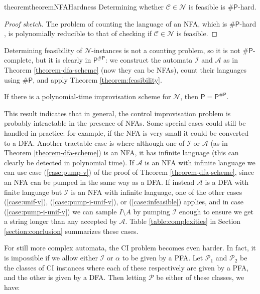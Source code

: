 \documentclass[a4paper,USenglish,numberwithinsect]{lipics}
\theoremstyle{plain}
\theoremstyle{definition}
\renewcommand{\P}{\mathsf{P}}
\newcommand{\sharpP}{\ensuremath{\mathsf{\# P}}}
\newcommand{\improvs}{I}
\newcommand{\valids}{A}
\begin{document}
\begin{restatable}{theorem}{theoremNFAHardness} \label{theorem:nfa-hardness}
Determining whether $\mathcal{C} \in \mathcal{N}$ is feasible is $\sharpP$-hard.
\end{restatable}
\begin{proof}[Proof sketch]
The problem of counting the language of an NFA, which is
$\sharpP$-hard \cite{sharpNFA}, is polynomially reducible to that of
checking if $\mathcal{C} \in \mathcal{N}$ is feasible.
\end{proof}
\begin{remark}
Determining feasibility of $\mathcal{N}$-instances is not a counting
problem, so it is not $\sharpP$-complete, but it is clearly in
$\P^\sharpP$: we construct the automata $\mathcal{\improvs}$ and
$\mathcal{\valids}$ as in Theorem \ref{theorem-dfa-scheme} (now they
can be NFAs), count their languages using $\sharpP$, and apply Theorem
\ref{theorem:feasibility}. 
\end{remark}

\begin{corollary}
If there is a polynomial-time improvisation scheme for $\mathcal{N}$, then $\P = \P^\sharpP$.
\end{corollary}

This result indicates that in general, the control improvisation
problem is probably intractable in the presence of NFAs. Some special
cases could still be handled in practice: for example, if the NFA is
very small it could be converted to a DFA. Another tractable case is
where although one of $\mathcal{\improvs}$ or $\mathcal{\valids}$ (as
in Theorem \ref{theorem-dfa-scheme}) is an NFA, it has infinite
language (this can clearly be detected in polynomial time). If
$\mathcal{\valids}$ is an NFA with infinite language we can use case
(\ref{case:pump-v}) of the proof of Theorem \ref{theorem-dfa-scheme}, since an NFA
can be pumped in the same way as a DFA. If instead $\mathcal{\valids}$
is a DFA with finite language but $\mathcal{\improvs}$ is an NFA with
infinite language, one of the other cases (\ref{case:unif-v}),
(\ref{case:pump-i-unif-v}), or (\ref{case:infeasible}) applies, and in
case (\ref{case:pump-i-unif-v}) we can sample $\improvs \setminus
\valids$ by pumping $\mathcal{\improvs}$ enough to ensure we get a
string longer than any accepted by $\mathcal{\valids}$. Table
\ref{table:complexities} in Section \ref{section:conclusion}
summarizes these cases. 

For still more complex automata, the CI problem becomes even
harder. In fact, it is impossible if we allow either
$\mathcal{\improvs}$ or $\alpha$ to be given by a PFA. Let
$\mathcal{P}_1$ and $\mathcal{P}_2$ be the classes of CI instances
where each of these respectively are given by a PFA, and the other is
given by a DFA. Then letting $\mathcal{P}$ be either of these classes,
we have: 
\end{document}
